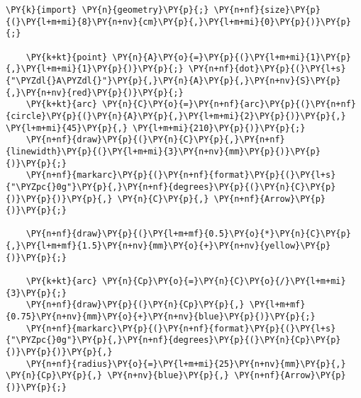 \begin{Verbatim}[commandchars=\\\{\}]
    \PY{k}{import} \PY{n}{geometry}\PY{p}{;} \PY{n+nf}{size}\PY{p}{(}\PY{l+m+mi}{8}\PY{n+nv}{cm}\PY{p}{,}\PY{l+m+mi}{0}\PY{p}{)}\PY{p}{;}

    \PY{k+kt}{point} \PY{n}{A}\PY{o}{=}\PY{p}{(}\PY{l+m+mi}{1}\PY{p}{,}\PY{l+m+mi}{1}\PY{p}{)}\PY{p}{;} \PY{n+nf}{dot}\PY{p}{(}\PY{l+s}{"\PYZdl{}A\PYZdl{}"}\PY{p}{,}\PY{n}{A}\PY{p}{,}\PY{n+nv}{S}\PY{p}{,}\PY{n+nv}{red}\PY{p}{)}\PY{p}{;}
    \PY{k+kt}{arc} \PY{n}{C}\PY{o}{=}\PY{n+nf}{arc}\PY{p}{(}\PY{n+nf}{circle}\PY{p}{(}\PY{n}{A}\PY{p}{,}\PY{l+m+mi}{2}\PY{p}{)}\PY{p}{,} \PY{l+m+mi}{45}\PY{p}{,} \PY{l+m+mi}{210}\PY{p}{)}\PY{p}{;}
    \PY{n+nf}{draw}\PY{p}{(}\PY{n}{C}\PY{p}{,}\PY{n+nf}{linewidth}\PY{p}{(}\PY{l+m+mi}{3}\PY{n+nv}{mm}\PY{p}{)}\PY{p}{)}\PY{p}{;}
    \PY{n+nf}{markarc}\PY{p}{(}\PY{n+nf}{format}\PY{p}{(}\PY{l+s}{"\PYZpc{}0g"}\PY{p}{,}\PY{n+nf}{degrees}\PY{p}{(}\PY{n}{C}\PY{p}{)}\PY{p}{)}\PY{p}{,} \PY{n}{C}\PY{p}{,} \PY{n+nf}{Arrow}\PY{p}{)}\PY{p}{;}

    \PY{n+nf}{draw}\PY{p}{(}\PY{l+m+mf}{0.5}\PY{o}{*}\PY{n}{C}\PY{p}{,}\PY{l+m+mf}{1.5}\PY{n+nv}{mm}\PY{o}{+}\PY{n+nv}{yellow}\PY{p}{)}\PY{p}{;}

    \PY{k+kt}{arc} \PY{n}{Cp}\PY{o}{=}\PY{n}{C}\PY{o}{/}\PY{l+m+mi}{3}\PY{p}{;}
    \PY{n+nf}{draw}\PY{p}{(}\PY{n}{Cp}\PY{p}{,} \PY{l+m+mf}{0.75}\PY{n+nv}{mm}\PY{o}{+}\PY{n+nv}{blue}\PY{p}{)}\PY{p}{;}
    \PY{n+nf}{markarc}\PY{p}{(}\PY{n+nf}{format}\PY{p}{(}\PY{l+s}{"\PYZpc{}0g"}\PY{p}{,}\PY{n+nf}{degrees}\PY{p}{(}\PY{n}{Cp}\PY{p}{)}\PY{p}{)}\PY{p}{,}
    \PY{n+nf}{radius}\PY{o}{=}\PY{l+m+mi}{25}\PY{n+nv}{mm}\PY{p}{,} \PY{n}{Cp}\PY{p}{,} \PY{n+nv}{blue}\PY{p}{,} \PY{n+nf}{Arrow}\PY{p}{)}\PY{p}{;}
\end{Verbatim}
